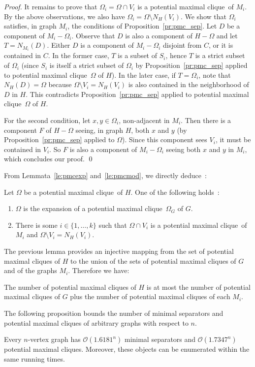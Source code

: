 \documentclass{llncs}
\newcommand{\cO}{\mathcal{O}}
\newcommand{\pmc}{potential maximal clique}
\newcommand{\goldratio}{1.6181}
\newcommand{\pmcb}{1.7347}
\begin{document}
\begin{proof}
It remains to prove that $\Omega_i = \Omega \cap V_i$  is a \pmc\ of $M_i$. By the above observations, we also have $\Omega_i = \Omega \setminus N_H(V_i)$. We show that $\Omega_i$ satisfies, in graph $M_i$, the conditions of Proposition~\ref{pr:pmc_sep}. Let $D$ be a component of $M_i - \Omega_i$. Observe that $D$ is also a component of $H - \Omega$ and let $T = N_{M_i}(D)$. Either $D$ is a component of $M_i - \Omega_i$ disjoint from $C$, or it is contained in $C$. In the former case, $T$ is a subset of $S_i$, hence $T$ is a strict subset of $\Omega_i$ (since $S_i$ is itself a strict subset of $\Omega_i$ by Proposition~\ref{pr:pmc_sep} applied to \pmc\ $\Omega$ of $H$). In the later case, if $T = \Omega_i$, note that $N_H(D) = \Omega$ because $\Omega \setminus V_i = N_H(V_i)$ is also contained in the neighborhood of $D$ in $H$. This contradicts Proposition~\ref{pr:pmc_sep} applied to \pmc\ $\Omega$ of $H$.

For the second condition, let $x,y \in \Omega_i$, non-adjacent in $M_i$. Then there is a component $F$ of $H - \Omega$ seeing, in graph $H$, both $x$ and $y$ (by Proposition~\ref{pr:pmc_sep} applied to $\Omega$). Since this component sees $V_i$, it must be contained in $V_i$. So $F$ is also a component of $M_i - \Omega_i$ seeing both $x$ and $y$ in $M_i$, which concludes our proof.
\qed
\end{proof}

From Lemmata~\ref{le:pmcexp} and~\ref{le:pmcmod}, we directly deduce~:
\begin{lemma}\label{le:pmcmw}
Let $\Omega$ be a \pmc\ of $H$. One of the following holds~:
\begin{enumerate}
\item $\Omega$ is the expansion of a \pmc\ $\Omega_G$ of $G$. 
\item There is some $i \in \{1, \dots, k\}$ such that $\Omega \cap V_i$ is a \pmc\ of $M_i$ and $\Omega \setminus V_i = N_H(V_i)$.
\end{enumerate}
\end{lemma}

The previous lemma provides an injective mapping from the set of \pmc s of $H$ to the union of the sets of \pmc s of $G$ and of the graphs $M_i$. Therefore we have:
\begin{corollary}\label{co:pmcexp}
The number of \pmc s of $H$ is at most the number of \pmc s of $G$ plus the number of \pmc s of each $M_i$. 
\end{corollary}

The following proposition bounds the number of minimal separators and \pmc s of arbitrary graphs with respect to $n$.
\begin{proposition}\label{pr:nbsep}\label{pr:nbpmc}
Every $n$-vertex graph has $\cO(\goldratio^n)$ minimal separators and $\cO(\pmcb^n)$ \pmc s. Moreover, these objects can be enumerated within the same running times. 
\end{proposition}
\end{document}
